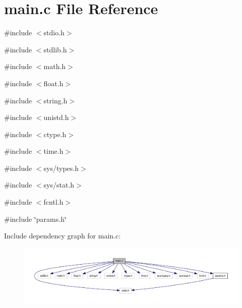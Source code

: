 \section{main.c File Reference}
\label{d0/d29/main_8c}
{\ttfamily \#include $<$stdio.h$>$}\par
{\ttfamily \#include $<$stdlib.h$>$}\par
{\ttfamily \#include $<$math.h$>$}\par
{\ttfamily \#include $<$float.h$>$}\par
{\ttfamily \#include $<$string.h$>$}\par
{\ttfamily \#include $<$unistd.h$>$}\par
{\ttfamily \#include $<$ctype.h$>$}\par
{\ttfamily \#include $<$time.h$>$}\par
{\ttfamily \#include $<$sys/types.h$>$}\par
{\ttfamily \#include $<$sys/stat.h$>$}\par
{\ttfamily \#include $<$fcntl.h$>$}\par
{\ttfamily \#include \char`\"{}params.h\char`\"{}}\par
Include dependency graph for main.c:\nopagebreak
\begin{figure}[H]
\begin{center}
\leavevmode
\includegraphics[width=400pt]{d4/d10/main_8c__incl}
\end{center}
\end{figure}
